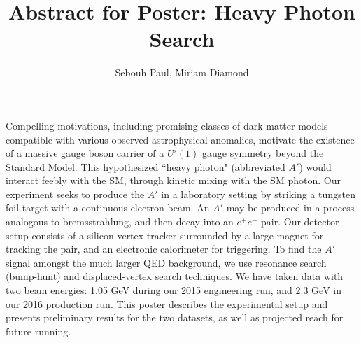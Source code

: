 \documentclass[11pt]{amsart}
\title{Abstract for Poster:  Heavy Photon Search}
\author{Sebouh Paul, Miriam Diamond}
\begin{document}
\maketitle
Compelling motivations, including promising classes of dark matter models compatible with various observed astrophysical anomalies, motivate the existence of a massive gauge boson carrier of a $U'(1)$ gauge symmetry beyond the Standard Model. This hypothesized ``heavy photon" (abbreviated $A'$) would interact feebly with the SM, through kinetic mixing with the SM photon.  Our experiment seeks to produce the $A'$ in a laboratory setting by striking a tungsten foil target with a continuous electron beam.  An $A'$ may be produced in a process analogous to bremsstrahlung, and then decay into an $e^+e^-$ pair.   Our detector setup consists of a silicon vertex tracker surrounded by a large magnet for tracking the pair, and an electronic calorimeter for triggering.  To find the $A'$ signal amongst the much larger QED background, we use resonance search (bump-hunt) and displaced-vertex search techniques.  We have taken data with two beam energies: 1.05 GeV during our 2015 engineering run, and 2.3 GeV in our 2016 production run. This poster describes the experimental setup and presents preliminary results for the two datasets, as well as projected reach for future running.  
\end{document}

